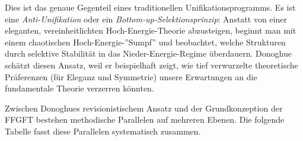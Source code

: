 	Dies ist das genaue Gegenteil eines traditionellen Unifikationsprogramms. Es ist eine \emph{Anti-Unifikation} oder ein \emph{Bottom-up-Selektionsprinzip}: Anstatt von einer eleganten, vereinheitlichten Hoch-Energie-Theorie abzusteigen, beginnt man mit einem chaotischen Hoch-Energie-''Sumpf'' und beobachtet, welche Strukturen durch selektive Stabilität in das Nieder-Energie-Regime überdauern. Donoghue schätzt diesen Ansatz, weil er beispielhaft zeigt, wie tief verwurzelte theoretische Präferenzen (für Eleganz und Symmetrie) unsere Erwartungen an die fundamentale Theorie verzerren könnten.
	
	
	Zwischen Donoghues revisionistischem Ansatz und der Grundkonzeption der FFGFT bestehen methodische Parallelen auf mehreren Ebenen. Die folgende Tabelle fasst diese Parallelen systematisch zusammen.
	
